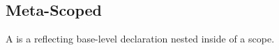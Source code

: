 \subsection{Meta-Scoped}
\label{concept-Meta-Scoped}

A  is a  reflecting base-level declaration nested
inside of a scope.




